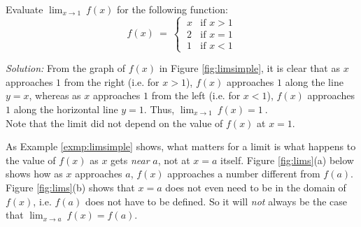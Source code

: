 \begin{exmp}\label{exmp:limsimple}
 \piccaption[]{\label{fig:limsimple}}
\noindent Evaluate $\displaystyle\lim_{x \to 1}~f(x)$ for the following function:
\[
 f(x) ~=~ \begin{cases}
           ~x & \text{if } x > 1\\
           ~2 & \text{if } x = 1\\
           ~1 & \text{if } x < 1
          \end{cases}
\]
\par\noindent\emph{Solution:} From the graph of $f(x)$ in Figure \ref{fig:limsimple},
it is clear that as $x$ approaches $1$ from the right (i.e. for $x > 1$), $f(x)$
approaches $1$ along the line $y = x$, whereas as $x$ approaches $1$ from the
left (i.e. for $x < 1$), $f(x)$ approaches $1$ along the horizontal line $y = 1$.
Thus, $\displaystyle\lim_{x \to 1}~f(x) = 1~$.\\
Note that the limit did not depend on the value of $f(x)$ at $x = 1$.
\end{exmp}
\divider
\vspace{3mm}

As Example \ref{exmp:limsimple} shows, what matters for a limit is what happens
to the value of $f(x)$ as $x$ gets
\emph{near} $a$, not at $x=a$ itself. Figure \ref{fig:lims}(a) below shows how
as $x$ approaches $a$, $f(x)$ approaches a number different from $f(a)$. Figure
\ref{fig:lims}(b) shows that $x=a$ does not even need to be in the domain of
$f(x)$, i.e. $f(a)$ does not have to be defined. So it will \emph{not} always
be the case that $\displaystyle\lim_{x \to a} ~f(x) = f(a)$.

